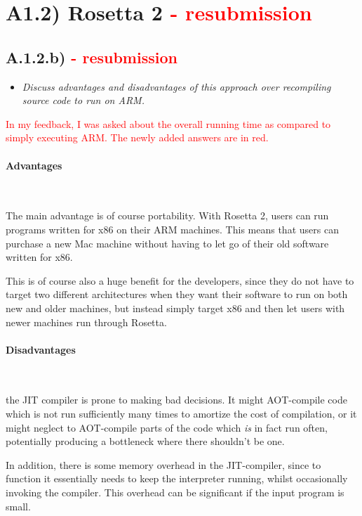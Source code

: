 \newpage
\section{A1.2) Rosetta 2 \textcolor{red}{- resubmission}}

\subsection{A.1.2.b) \textcolor{red}{- resubmission}}

\begin{itemize}
    \item \emph{Discuss advantages and disadvantages of this approach over
      recompiling source code to run on ARM.}
\end{itemize}

\textcolor{red}{In my feedback, I was asked about the overall running time as
compared to simply executing ARM. The newly added answers are in red.}


\paragraph{Advantages}~\smallskip

The main advantage is of course portability. With Rosetta 2, users can run
programs written for x86 on their ARM machines. This means that users can
purchase a new Mac machine without having to let go of their old software
written for x86.

\medskip

This is of course also a huge benefit for the developers, since they do not have
to target two different architectures when they want their software to run on
both new and older machines, but instead simply target x86 and then let users
with newer machines run through Rosetta.

\paragraph{Disadvantages}~\smallskip

the JIT compiler is prone to making bad decisions. It might AOT-compile code
which is not run sufficiently many times to amortize the cost of compilation, or
it might neglect to AOT-compile parts of the code which \emph{is} in fact run
often, potentially producing a bottleneck where there shouldn't be one.

\medskip

In addition, there is some memory overhead in the JIT-compiler, since to
function it essentially needs to keep the interpreter running, whilst
occasionally invoking the compiler. This overhead can be significant if the input
program is small.

